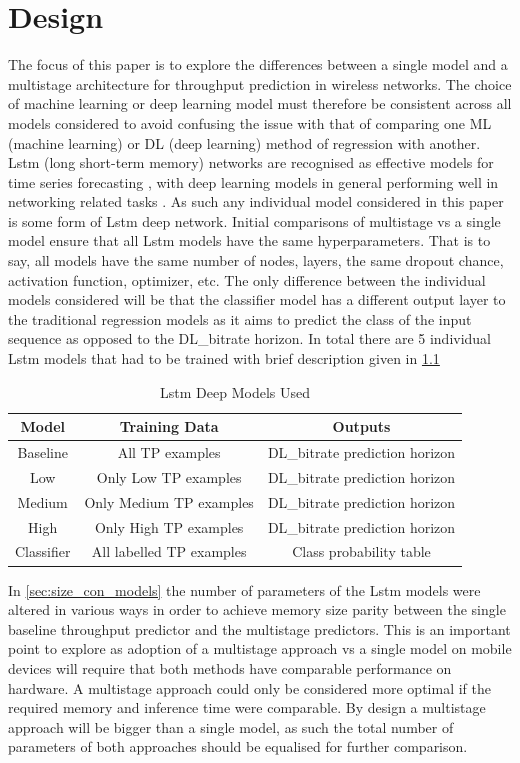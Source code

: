 \chapter{Design}
The focus of this paper is to explore the differences between a single model and a multistage architecture for throughput prediction in wireless networks. The choice of machine learning or deep learning model must therefore be consistent across all models considered to avoid confusing the issue with that of comparing one ML (machine learning) or DL (deep learning) method of regression with another. Lstm (long short-term memory) networks are recognised as effective models for time series forecasting \cite{8614252}, with deep learning models in general performing well in networking related tasks \cite{8666641}. As such any individual model considered in this paper is some form of Lstm deep network. Initial comparisons of multistage vs a single model ensure that all Lstm models have the same hyperparameters. That is to say, all models have the same number of nodes, layers, the same dropout chance, activation function, optimizer, etc. The only difference between the individual models considered will be that the classifier model has a different output layer to the traditional regression models as it aims to predict the class of the input sequence as opposed to the DL\_bitrate horizon. In total there are 5 individual Lstm models that had to be trained with brief description given in \ref{tab:brief_models}

\begin{table}[!htb]
  \centering
  \caption{Lstm Deep Models Used}
  \begin{tabular}{|c|c|c|}
  \hline
    {Model} & {Training Data} & {Outputs} \\
    \hline
	Baseline & All TP examples & DL\_bitrate prediction horizon \\
	\hline
	Low & Only Low TP examples & DL\_bitrate prediction horizon \\
	\hline
	Medium & Only Medium TP examples & DL\_bitrate prediction horizon \\
	\hline
	High & Only High TP examples & DL\_bitrate prediction horizon \\
	\hline
	Classifier & All labelled TP examples & Class probability table \\
  \hline
  \end{tabular}
  \label{tab:brief_models}
\end{table}


In \ref{sec:size_con_models} the number of parameters of the Lstm models were altered in various ways in order to achieve memory size parity between the single baseline throughput predictor and the multistage predictors. This is an important point to explore as adoption of a multistage approach vs a single model on mobile devices will require that both methods have comparable performance on hardware. A multistage approach could only be considered more optimal if the required memory and inference time were comparable. By design a multistage approach will be bigger than a single model, as such the total number of parameters of both approaches should be equalised for further comparison.


